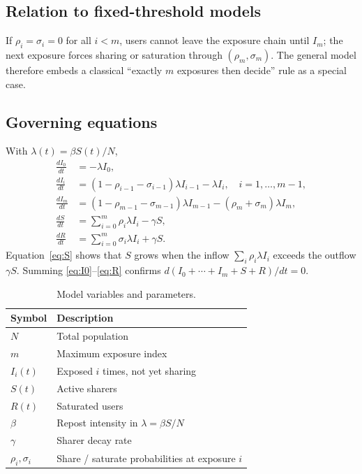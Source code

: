 \documentclass[11pt]{article}
\begin{document}
\subsection{Relation to fixed-threshold models}

If $\rho_i=\sigma_i=0$ for all $i<m$, users cannot leave the exposure chain until $I_m$; the next exposure forces sharing or saturation through $(\rho_m,\sigma_m)$. The general model therefore embeds a classical ``exactly $m$ exposures then decide'' rule as a special case.

\subsection{Governing equations}

With $\lambda(t)=\beta S(t)/N$,
\begin{align}
\frac{dI_0}{dt} &= -\lambda I_0, \label{eq:I0}\\
\frac{dI_i}{dt} &= (1-\rho_{i-1}-\sigma_{i-1})\lambda I_{i-1} - \lambda I_i, \quad i=1,\ldots,m-1, \label{eq:Ii}\\
\frac{dI_m}{dt} &= (1-\rho_{m-1}-\sigma_{m-1})\lambda I_{m-1} - (\rho_m+\sigma_m)\lambda I_m, \label{eq:Im}\\
\frac{dS}{dt} &= \sum_{i=0}^{m} \rho_i \lambda I_i - \gamma S, \label{eq:S}\\
\frac{dR}{dt} &= \sum_{i=0}^{m} \sigma_i \lambda I_i + \gamma S. \label{eq:R}
\end{align}
Equation~\eqref{eq:S} shows that $S$ grows when the inflow $\sum_i \rho_i\lambda I_i$ exceeds the outflow $\gamma S$. Summing \eqref{eq:I0}--\eqref{eq:R} confirms $d(I_0+\cdots+I_m+S+R)/dt=0$.

\begin{table}[htbp]
\centering
\caption{Model variables and parameters.}
\label{tab:vars}
\begin{tabular}{|l|l|}
\hline
\textbf{Symbol} & \textbf{Description} \\
\hline
$N$ & Total population \\
$m$ & Maximum exposure index \\
$I_i(t)$ & Exposed $i$ times, not yet sharing \\
$S(t)$ & Active sharers \\
$R(t)$ & Saturated users \\
$\beta$ & Repost intensity in $\lambda=\beta S/N$ \\
$\gamma$ & Sharer decay rate \\
$\rho_i,\sigma_i$ & Share / saturate probabilities at exposure $i$ \\
\hline
\end{tabular}
\end{table}
\end{document}
